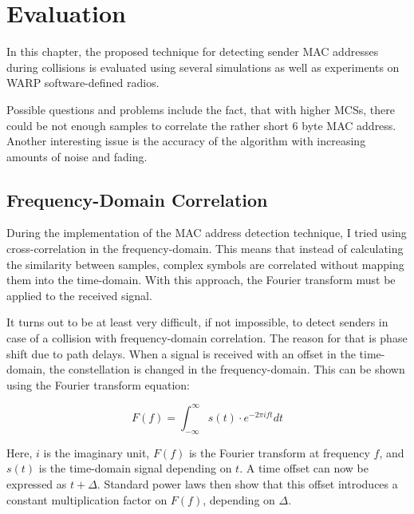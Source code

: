 
\chapter{Evaluation}\label{ch:evaluation}
\glsresetall %

In this chapter, the proposed technique for detecting sender MAC addresses during collisions is evaluated using several simulations as well as experiments on WARP software-defined radios.

Possible questions and problems include the fact, that with higher \glspl{MCS}, there could be not enough samples to correlate the rather short 6 byte MAC address. Another interesting issue is the accuracy of the algorithm with increasing amounts of noise and fading.



\section{Frequency-Domain Correlation}\label{sec:freqd-correlation}

During the implementation of the MAC address detection technique, I tried using cross-correlation in the frequency-domain. This means that instead of calculating the similarity between samples, complex symbols are correlated without mapping them into the time-domain. With this approach, the Fourier transform must be applied to the received signal.

It turns out to be at least very difficult, if not impossible, to detect senders in case of a collision with frequency-domain correlation. The reason for that is phase shift due to path delays. When a signal is received with an offset in the time-domain, the constellation is changed in the frequency-domain. This can be shown using the Fourier transform equation:

$$ F(f) = \int_{-\infty}^{\infty} s(t) \cdot e^{-2 \pi i f t} dt $$\vspace{0cm}

Here, $ i $ is the imaginary unit, $ F(f) $ is the Fourier transform at frequency $ f $, and $ s(t) $ is the time-domain signal depending on $ t $. A time offset can now be expressed as $ t + \Delta $. Standard power laws then show that this offset introduces a constant multiplication factor on $ F(f) $, depending on $ \Delta $.

